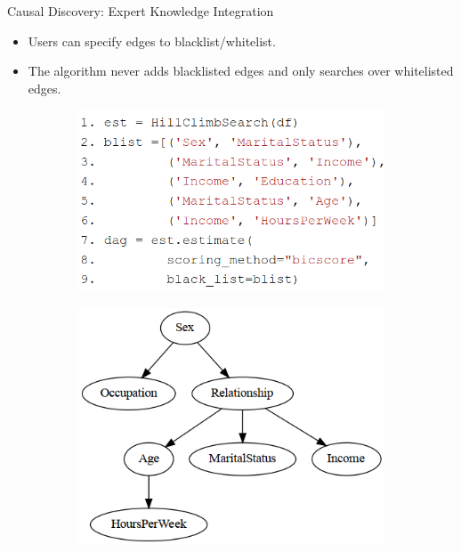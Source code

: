 \documentclass[aspectratio=169]{beamer}
\begin{document}
\begin{frame}{Causal Discovery: Expert Knowledge Integration}
	\begin{itemize}
		\item Users can specify edges to blacklist/whitelist.
		\item The algorithm never adds blacklisted edges and only
			searches over whitelisted edges.
	\end{itemize}
	\vfill
	\begin{figure}
		\begin{subfigure}{0.5 \textwidth}
			\centering
			\includegraphics[scale=0.28]{imgs/adult_blacklist.png}
		\end{subfigure}%
		\begin{subfigure}{0.5 \textwidth}
			\centering
			\includegraphics[scale=0.3]{imgs/adult_bic_blacklist.png}
		\end{subfigure}
	\end{figure}
\end{frame}
\end{document}
